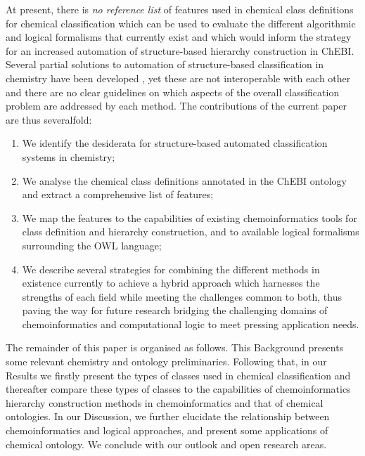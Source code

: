 \documentclass[10pt]{bmc_article}
\newenvironment{bmcformat}{\baselineskip20pt\sloppy\setboolean{publ}{false}}{\baselineskip20pt\sloppy}
\begin{document}
\begin{bmcformat}

At present, there is \textit{no reference list} of features used in chemical class definitions for chemical classification which can be used to evaluate the different algorithmic and logical formalisms that currently exist and which would inform the strategy for an increased automation of structure-based hierarchy construction in ChEBI. Several partial solutions to automation of structure-based classification in chemistry have been developed %
, yet these are not interoperable with each other and there are no clear guidelines on which aspects of the overall classification problem are addressed by each method. The contributions of the current paper are thus severalfold:
\begin{enumerate}
	\item We identify the desiderata for structure-based automated classification systems in chemistry;
	\item We analyse the chemical class definitions annotated in the ChEBI ontology and extract a comprehensive list of features;
	\item We map the features to the capabilities of existing chemoinformatics tools for class definition and hierarchy construction, and to available logical formalisms surrounding the OWL language;
	\item We describe several strategies for combining the different methods in existence currently to achieve a hybrid approach which harnesses the strengths of each field while meeting the challenges common to both, thus paving the way for future research bridging the challenging domains of chemoinformatics and computational logic to meet pressing application needs. 
\end{enumerate}
 
The remainder of this paper is organised as follows. This Background presents some relevant chemistry and ontology preliminaries.  Following that, in our Results we firstly present the types of classes used in chemical classification and thereafter compare these types of classes to the capabilities of chemoinformatics hierarchy construction methods in chemoinformatics and that of chemical ontologies. In our Discussion, we further elucidate the relationship between chemoinformatics and logical approaches, and present some applications of chemical ontology.  We conclude with our outlook and open research areas. 




\end{bmcformat}
\end{document}
